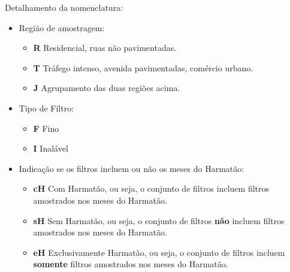 Detalhamento da nomenclatura: 
\begin{itemize}
\item Região de amostragem: 
	\begin{itemize}
	\item \textbf{R} Residencial, ruas não pavimentadas. 
	\item \textbf{T} Tráfego intenso, avenida pavimentadas, comércio urbano.
	\item \textbf{J} Agrupamento das duas regiões acima.
	\end{itemize}
\item Tipo de Filtro:
	\begin{itemize}
	\item \textbf{F} Fino
	\item \textbf{I} Inalável
	\end{itemize}
\item Indicação se os filtros incluem ou não os meses do Harmatão:
	\begin{itemize}
	\item \textbf{cH} Com Harmatão, ou seja, o conjunto de filtros 
        incluem filtros amostrados nos meses do Harmatão.
	\item \textbf{sH} Sem Harmatão, ou seja, o conjunto de filtros \textbf{não} 
        incluem filtros amostrados nos meses do Harmatão.
	\item \textbf{eH} Exclusivamente Harmatão, ou seja, o conjunto de filtros 
        incluem \textbf{somente} filtros amostrados nos meses do Harmatão.
	\end{itemize}
\end{itemize}
